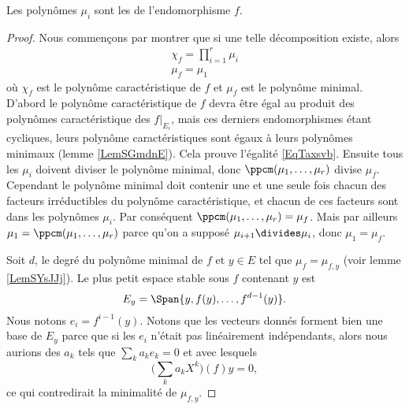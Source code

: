 Les polynômes \( \mu_i\) sont les  de l'endomorphisme \( f\).

\begin{proof}
    Nous commençons par montrer que si une telle décomposition existe, alors
    \begin{subequations}    \label{subEqzcGouz}
        \begin{align}
            \chi_f=\prod_{i=1}^r\mu_i  \label{EqTaxsvb}\\
            \mu_f=\mu_1
        \end{align}
    \end{subequations}
    où \( \chi_f\) est le polynôme caractéristique de \( f\) et \( \mu_f\) est le polynôme minimal. D'abord le polynôme caractéristique de \( f\) devra être égal au produit des polynômes caractéristique des \( f|_{E_i}\), mais ces derniers endomorphismes étant cycliques, leurs polynôme caractéristiques sont égaux à leurs polynômes minimaux (lemme \ref{LemSGmdnE}). Cela prouve l'égalité \eqref{EqTaxsvb}. Ensuite tous les \( \mu_i\) doivent diviser le polynôme minimal, donc \( \ppcm(\mu_1,\ldots, \mu_r)\) divise \(\mu_f\). Cependant le polynôme minimal doit contenir une et une seule fois chacun des facteurs irréductibles du polynôme caractéristique, et chacun de ces facteurs sont dans les polynômes \( \mu_i\). Par conséquent \( \ppcm(\mu_1,\ldots, \mu_r)=\mu_f\). Mais par ailleurs \( \mu_1=\ppcm(\mu_1,\ldots, \mu_r)\) parce qu'on a supposé \( \mu_{i+1}\divides \mu_i\), donc \( \mu_1=\mu_f\).
    
    Soit \( d\), le degré du polynôme minimal de \( f\) et \( y\in E\) tel que \( \mu_f=\mu_{f,y}\) (voir lemme \ref{LemSYsJJj}). Le plus petit espace stable sous \( f\) contenant \( y\) est
    \begin{equation}
        E_y=\Span\{ y,f(y),\ldots, f^{d-1}(y) \}.
    \end{equation}
    Nous notons \( e_i=f^{i-1}(y)\). Notons que les vecteurs donnés forment bien une base de \( E_y\) parce que si les \( e_i\) n'était pas linéairement indépendants, alors nous aurions des \( a_k\) tels que \( \sum_ka_ke_k=0\) et avec lesquels
    \begin{equation}
        \big( \sum_ka_kX^k \big)(f)y=0,
    \end{equation}
    ce qui contredirait la minimalité de \( \mu_{f,y}\).


\end{proof}
